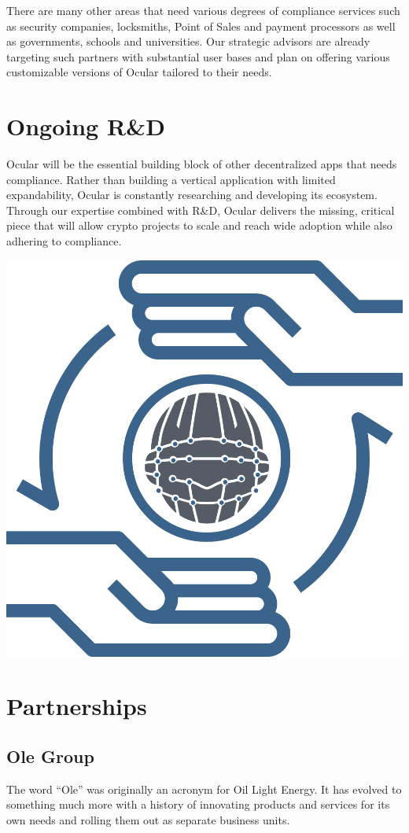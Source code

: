 \documentclass[a4paper]{article}
\begin{document}
There are many other areas that need various degrees of compliance services such as security companies, locksmiths, Point of Sales and payment processors as well as governments, schools and universities. Our strategic advisors are already targeting such partners with substantial user bases and plan on offering various customizable versions of Ocular tailored to their needs.  
\section{Ongoing R\&D}
Ocular will be the essential building block of other decentralized apps that needs compliance. Rather than building a vertical application with limited expandability, Ocular is constantly researching and developing its ecosystem. Through our expertise combined  with R\&D, Ocular delivers the missing, critical piece that will allow crypto projects to scale and reach wide adoption while also adhering to compliance.
\clearpage

\centerline{\includegraphics[width=1.0\textwidth]{ocular-exchange}}
\section{Partnerships}
\subsection{Ole Group}
The word “Ole” was originally an acronym for Oil Light Energy. It has evolved to something much more with a history of innovating products and services for its own needs and rolling them out as separate business units.
 
\end{document}
